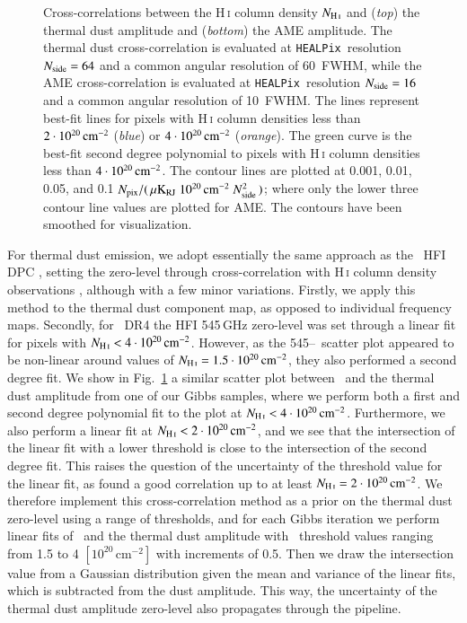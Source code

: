 \documentclass[twocolumn]{aa}
\def\healpix{\texttt{HEALPix}}
\begin{document}
\begin{figure}
  \caption{Cross-correlations between the H\,\textsc i column density
    $N_{\mathrm{H\,\textsc i}}$ and (\emph{top}) the thermal dust amplitude and
    (\emph{bottom}) the AME amplitude. The thermal dust
    cross-correlation is evaluated at \healpix\ resolution $\nside
    = 64$ and a common angular resolution of 60\arcm\ FWHM, while the
    AME cross-correlation is evaluated at \healpix\ resolution
    $\nside = 16$ and a common angular resolution of 10\deg\ FWHM. The
    lines represent best-fit lines for pixels with H\,\textsc i column densities
    less than $2\cdot 10^{20}\cmisq$ (\emph{blue}) or $4\cdot
    10^{20}\cmisq$ (\emph{orange}). The green curve is the best-fit
    second degree polynomial to pixels with H\,\textsc i column densities less
    than $4\cdot 10^{20}\cmisq$. 
    The contour lines are plotted at 0.001, 0.01, 0.05, and 0.1 $N_{\mathrm{pix}}/(\,\mu\mathrm{K_{RJ}}\; 10^{20}\,\mathrm{cm}^{-2}\; \nside^2\,)$; where only the lower three contour line values are plotted for AME. The contours have been smoothed for visualization.
     }
  \label{fig:nhi_corrplot}
\end{figure}

For thermal dust emission, we adopt essentially the same approach as
the \Planck\ HFI DPC \citep[e.g., see][]{planck2016-l03}, setting the
zero-level through cross-correlation with H\,\textsc i column density
observations \citep[e.g., see][]{Lenz_et_al:2017}, although with a few
minor variations. Firstly, we apply this method to the thermal dust
component map, as opposed to individual frequency maps. Secondly, for
\Planck\ DR4 \citep{npipe} the HFI 545\,GHz zero-level was set through
a linear fit for pixels with $\NHI <
4\cdot10^{20}\,\mathrm{cm}^{-2}$. However, as the 545--\NHI\ scatter
plot appeared to be non-linear around values of $\NHI =
1.5\cdot10^{20}\,\mathrm{cm}^{-2}$, they also performed a second
degree fit. We show in Fig.~\ref{fig:nhi_corrplot} a similar scatter
plot between \NHI\ and the thermal dust amplitude from one of our
Gibbs samples, where we perform both a first and second degree
polynomial fit to the plot at $\NHI <
4\cdot10^{20}\,\mathrm{cm}^{-2}$. Furthermore, we also perform a
linear fit at $\NHI < 2\cdot 10^{20}\,\mathrm{cm}^{-2}$, and we see
that the intersection of the linear fit with a lower threshold is
close to the intersection of the second degree fit. This raises the
question of the uncertainty of the threshold value for the linear fit,
as \citet{planck2011-7.12} found a good correlation up to at least
$\NHI = 2\cdot 10^{20}\,\mathrm{cm}^{-2}$. We therefore implement this
cross-correlation method as a prior on the thermal dust zero-level
using a range of thresholds, and for each Gibbs iteration we perform
linear fits of \NHI\ and the thermal dust amplitude with
\NHI\ threshold values ranging from 1.5 to 4
$[10^{20}\,\mathrm{cm}^{-2}]$ with increments of 0.5. Then we draw the
intersection value from a Gaussian distribution given the mean and
variance of the linear fits, which is subtracted from the dust
amplitude. This way, the uncertainty of the thermal dust amplitude
zero-level also propagates through the pipeline.
\end{document}
